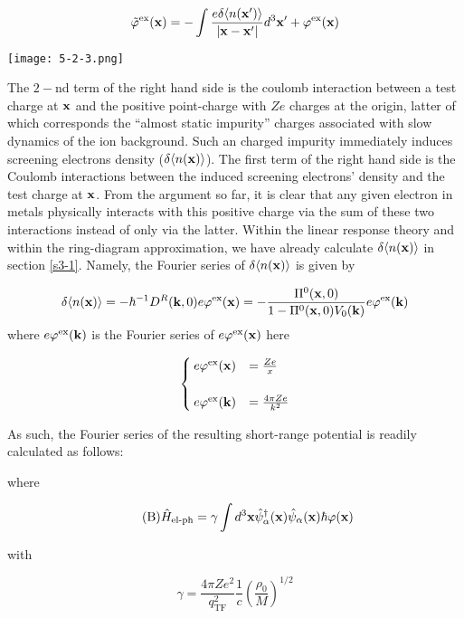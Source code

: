 \[\tilde\varphi^{\text{ex}}({\bf x})=-\int\frac{e\delta\langle n({\bf x}')\rangle}{|\bf x-x'|}d^3{\bf x'}+\varphi^{\text{ex}}({\bf x}) \]

\texttt{[image: 5-2-3.png]}

The $2-$nd term of the right hand side is the coulomb interaction between a test charge at $\bf x$ and the positive point-charge with $Ze$ charges at the origin, latter of which corresponds the ``almost static impurity'' charges associated with slow dynamics of the ion background. Such an charged impurity immediately induces screening electrons density ($\delta\langle n({\bf x})\rangle$). The first term of the right hand side is the Coulomb interactions between the induced screening electrons' density and the test charge at $\bf x$. From the argument so far, it is clear that any given electron in metals physically interacts with this positive charge via the sum of these two interactions instead of only via the latter. Within the linear response theory and within the ring-diagram approximation, we have already calculate $\delta\langle n({\bf x})\rangle$ in section \ref{s3-1}. Namely, the Fourier series of $\delta\langle n({\bf x})\rangle$ is given by

\[\delta\langle n({\bf x})\rangle =-\hbar^{-1}D^R({\bf k},0)e\varphi^{\text{ex}}({\bf x}) = -\frac{\Pi^0({\bf x},0)}{1- \Pi^0({\bf x},0)V_0({\bf k})}e\varphi^{\text{ex}}({\bf k})\]
where $e\varphi^{\text{ex}}({\bf k})$ is the Fourier series of $e\varphi^{\text{ex}}({\bf x})$ here

\[\begin{cases}
e\varphi^{\text{ex}}({\bf x}) &= \frac{Ze}{x}\\
&\\
e\varphi^{\text{ex}}({\bf k}) &= \frac{4\pi Ze}{k^2}
\end{cases}\]

As such, the Fourier series of the resulting short-range potential is readily calculated as follows:

where

\begin{align}\tag{B}\label{5B}
\hat{H}_{\text{el-ph}} = \gamma\int d^3{\bf x}\hat{\psi}_{\alpha}^\dagger({\bf x})\hat{\psi}_{\alpha}({\bf x})\hbar\varphi({\bf x})
\end{align}

with

\[\gamma = \frac{4\pi Ze^2}{q_{\text{TF}}^2}\frac{1}{c}\left(\frac{\rho_0}{M}\right)^{1/2} \]

